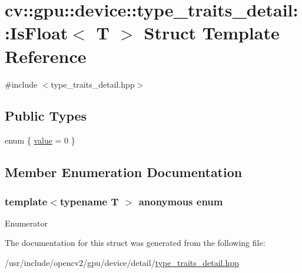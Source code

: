 \hypertarget{structcv_1_1gpu_1_1device_1_1type__traits__detail_1_1IsFloat}{\section{cv\-:\-:gpu\-:\-:device\-:\-:type\-\_\-traits\-\_\-detail\-:\-:Is\-Float$<$ T $>$ Struct Template Reference}
\label{structcv_1_1gpu_1_1device_1_1type__traits__detail_1_1IsFloat}
}


{\ttfamily \#include $<$type\-\_\-traits\-\_\-detail.\-hpp$>$}

\subsection*{Public Types}
\begin{DoxyCompactItemize}
\item 
enum \{ \hyperlink{structcv_1_1gpu_1_1device_1_1type__traits__detail_1_1IsFloat_a2963a6751c636bff1092ced45604915bafb68aac8d1ffacbe0745e2da41a44cb9}{value} = 0
 \}
\end{DoxyCompactItemize}


\subsection{Member Enumeration Documentation}
\hypertarget{structcv_1_1gpu_1_1device_1_1type__traits__detail_1_1IsFloat_a2963a6751c636bff1092ced45604915b}{\subsubsection[{anonymous enum}]{\setlength{\rightskip}{0pt plus 5cm}template$<$typename T $>$ anonymous enum}}\label{structcv_1_1gpu_1_1device_1_1type__traits__detail_1_1IsFloat_a2963a6751c636bff1092ced45604915b}
\begin{Desc}
\item[Enumerator]\par
\begin{description}
\item[{\em 
\hypertarget{structcv_1_1gpu_1_1device_1_1type__traits__detail_1_1IsFloat_a2963a6751c636bff1092ced45604915bafb68aac8d1ffacbe0745e2da41a44cb9}{value}\label{structcv_1_1gpu_1_1device_1_1type__traits__detail_1_1IsFloat_a2963a6751c636bff1092ced45604915bafb68aac8d1ffacbe0745e2da41a44cb9}
}]\end{description}
\end{Desc}


The documentation for this struct was generated from the following file\-:\begin{DoxyCompactItemize}
\item 
/usr/include/opencv2/gpu/device/detail/\hyperlink{type__traits__detail_8hpp}{type\-\_\-traits\-\_\-detail.\-hpp}\end{DoxyCompactItemize}
